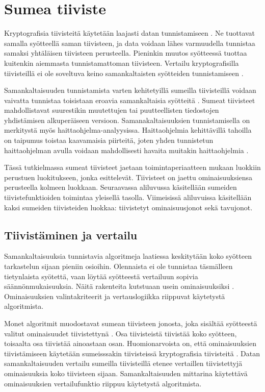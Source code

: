 \chapter{Sumea tiiviste\label{fuzzy-hash}}


Kryptografisia tiivisteitä käytetään laajasti datan tunnistamiseen \parencite{kornblum06}. Ne tuottavat
samalla syötteellä saman tiivisteen, ja data voidaan lähes varmuudella tunnistaa
samaksi yhtäläisen tiivisteen perusteella. Pieninkin muutos syötteessä tuottaa
kuitenkin aiemmasta tunnistamattoman tiivisteen. Vertailu kryptografisilla
tiivisteillä ei ole soveltuva keino samankaltaisten syötteiden tunnistamiseen
\citep{kornblum06}.

Samankaltaisuuden tunnistamista varten kehitetyillä sumeilla tiivisteillä
voidaan vaivatta tunnistaa toisistaan eroavia samankaltaisia syötteitä \parencite{kornblum06}. Sumeat
tiivisteet mahdollistavat suurestikin muutettujen tai puutteellisten tiedostojen
yhdistämisen alkuperäiseen versioon. Samanakaltaisuuksien tunnistamisella
on merkitystä myös haittaohjelma-analyysissa. Haittaohjelmia
kehittävillä tahoilla on taipumus toistaa kaavamaisia piirteitä,
joten yhden tunnistetun haittaohjelman avulla voidaan mahdollisesti
havaita muitakin haittaohjelmia \parencite{naik19}.

Tässä tutkielmassa sumeat tiivisteet jaetaan toimintaperiaatteen
mukaan luokkiin perustuen luokitukseen, jonka \textcite{martin-perez21}
esittelevät.
Tiivisteet on jaettu ominaisuuksiensa perusteella kolmeen luokkaan.
Seuraavassa aliluvussa käsitellään sumeiden tiivistefunktioiden
toimintaa yleisellä tasolla. Viimeisissä aliluvuissa käsitellään
kaksi sumeiden tiivisteiden luokkaa: tiivistetyt ominaisuusjonot sekä
tavujonot.

\section{Tiivistäminen ja vertailu}

Samankaltaisuuksia tunnistavia algoritmeja laatiessa keskitytään
koko syötteen tarkastelun sijaan pieniin osioihin.
Olennaista ei ole tunnistaa täsmälleen tietynlaista syötettä,
vaan löytää syötteestä vertailuun sopivia säännönmukaisuuksia. Näitä
rakenteita kutstuaan usein ominaisuuksiksi \parencite{martin-perez21}.
Ominaisuuksien valintakriteerit ja vertauslogiikka riippuvat
käytetystä algoritmista.

Monet algoritmit muodostavat sumean tiivisteen jonosta, joka
sisältää syötteestä valitut ominaisuudet tiivistettynä \parencite{martin-perez21}.
Osa tiivisteistä tiivistää koko syötteen, toisaalta
osa tiivistää ainoastaan osan. Huomionarvoista
on, että ominaisuuksien tiivistämiseen käytetään
sumeisssakin tiivisteissä kryptografisia tiivisteitä \parencite{kornblum06}.
Datan samankaltaisuuden vertailu sumeilla tiivisteillä etenee
vertaillen tiivistettyjä ominaisuuksia koko tiivisteen sijaan.
Samankaltaisuuden mittarina käytettävä ominaisuuksien
vertailufunktio riippuu käytetystä algoritmista.

